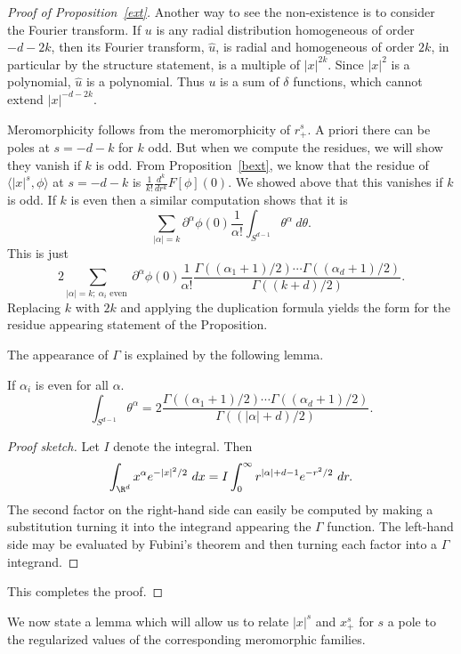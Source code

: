 \documentclass[12pt]{article}
\begin{document}
\begin{proof}[Proof of Proposition~\ref{ext}]
Another way to see the non-existence is to consider the Fourier transform. If $u$ is any radial distribution homogeneous of order $-d-2k$, then its Fourier transform, $\widehat{u}$, is radial and homogeneous of order $2k$, in particular by the structure statement, is a multiple of $|x|^{2k}$. Since $|x|^2$ is a polynomial, $\widehat{u}$ is a polynomial. Thus $u$ is a sum of $\delta$ functions, which cannot extend $|x|^{-d-2k}$.

Meromorphicity follows from the meromorphicity of $r_+^s$. A priori there can be poles at $s=-d-k$ for $k$ odd. But when we compute the residues, we will show they vanish if $k$ is odd. From Proposition~\ref{bext}, we know that the residue of
$\langle |x|^s,\phi\rangle$ at $s=-d-k$ is $\frac{1}{k!}\frac{d^k}{dr^k}F[\phi](0)$. We showed above that this vanishes if $k$ is odd. If $k$ is even then a similar computation shows that it is
\[\sum_{|\alpha|=k} \partial^{\alpha}\phi(0)\frac{1}{\alpha!}\int_{S^{d-1}} \theta^{\alpha}\ d\theta.\]
This is just
\[2\sum_{|\alpha| = k; \ \alpha_i \text{ even }}\partial^{\alpha}\phi(0)\frac{1}{\alpha!}\frac{\Gamma((\alpha_1+1)/2)\cdots\Gamma((\alpha_d+1)/2)}{\Gamma((k+d)/2)}.\] Replacing $k$ with $2k$ and applying the duplication formula yields the form for the residue appearing statement of the Proposition.

The appearance of $\Gamma$ is explained by the following lemma.
\begin{lem}If $\alpha_i$ is even for all $\alpha$. \[\int_{S^{d-1}} \theta^{\alpha} = 2\frac{\Gamma((\alpha_1+1)/2)\cdots\Gamma((\alpha_d+1)/2)}{\Gamma((|\alpha|+d)/2)}.\]\end{lem}
\begin{proof}[Proof sketch]Let $I$ denote the integral. Then
\[\int_{\R^d} x^{\alpha}e^{-|x|^2/2}\ dx = I \int_0^\infty r^{|\alpha|+d-1}e^{-r^2/2}\ dr.\] The second factor on the right-hand side can easily be computed by making a substitution turning it into the integrand appearing the $\Gamma$ function. The left-hand side may be evaluated by Fubini's theorem and then turning each factor into a $\Gamma$ integrand.
\end{proof}
This completes the proof.
\end{proof}
We now state a lemma which will allow us to relate $|x|^s$ and $x_+^s$ for $s$ a pole to the regularized values of the corresponding meromorphic families.
\end{document}
